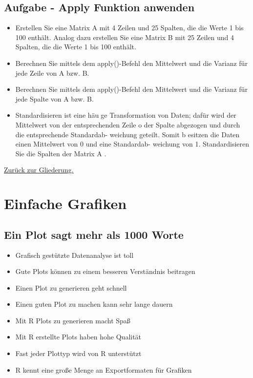 \documentclass[]{article}
\providecommand{\tightlist}{%
  \setlength{\itemsep}{0pt}\setlength{\parskip}{0pt}}
\begin{document}
\subsection{Aufgabe - Apply Funktion
anwenden}\label{aufgabe---apply-funktion-anwenden}

\begin{itemize}
\item
  Erstellen Sie eine Matrix A mit 4 Zeilen und 25 Spalten, die die Werte
  1 bis 100 enthält. Analog dazu erstellen Sie eine Matrix B mit 25
  Zeilen und 4 Spalten, die die Werte 1 bis 100 enthält.
\item
  Berechnen Sie mittels dem apply()-Befehl den Mittelwert und die
  Varianz für jede Zeile von A bzw. B.
\item
  Berechnen Sie mittels dem apply()-Befehl den Mittelwert und die
  Varianz für jede Spalte von A bzw. B.
\item
  Standardisieren ist eine häuge Transformation von Daten; dafür wird
  der Mittelwert von der entsprechenden Zeile o der Spalte abgezogen und
  durch die entsprechende Standardab- weichung geteilt. Somit b esitzen
  die Daten einen Mittelwert von 0 und eine Standardab- weichung von 1.
  Standardisieren Sie die Spalten der Matrix A .
\end{itemize}

\href{https://github.com/Japhilko/IntroR/blob/master/2016/README.md}{Zurück
zur Gliederung.}

\section{Einfache Grafiken}\label{einfache-grafiken}

\subsection{Ein Plot sagt mehr als 1000
Worte}\label{ein-plot-sagt-mehr-als-1000-worte}

\begin{itemize}
\tightlist
\item
  Grafisch gestützte Datenanalyse ist toll
\item
  Gute Plots können zu einem besseren Verständnis beitragen
\item
  Einen Plot zu generieren geht schnell
\item
  Einen guten Plot zu machen kann sehr lange dauern
\item
  Mit R Plots zu generieren macht Spaß
\item
  Mit R erstellte Plots haben hohe Qualität
\item
  Fast jeder Plottyp wird von R unterstützt
\item
  R kennt eine große Menge an Exportformaten für Grafiken
\end{itemize}
\end{document}

